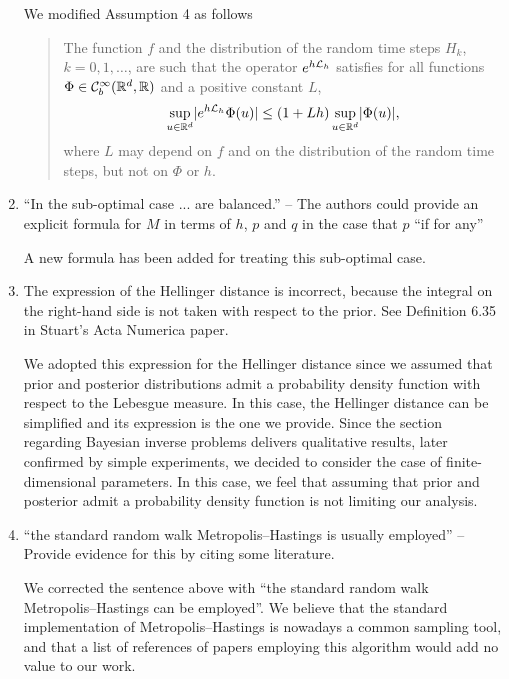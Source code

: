 \documentclass[10pt]{article}
\begin{document}
\begin{enumerate}
\begin{itquote}
	\end{itquote}
	We modified Assumption 4 as follows
	\begin{quote}
		The function $f$ and the distribution of the random time steps $H_k$, $k = 0, 1, \ldots$, are such that the operator $e^{h\mathcal{L}_h}$ satisfies for all functions $\Phi\in \mathcal C^\infty_b(\mathbb{R}^d, \mathbb{R})$ and a positive constant $L$, 
		\begin{equation}
		\sup_{u\in\mathbb{R}^d} \lvert e^{h\mathcal{L}_h}\Phi(u)\rvert \leq (1 + Lh)\sup_{u\in\mathbb{R}^d}\lvert\Phi(u)\rvert,
		\end{equation}
		where $L$ may depend on $f$ and on the distribution of the random time steps, but not on $\Phi$ or $h$.
	\end{quote}
	\item 
	\begin{itquote}
	``In the sub-optimal case ... are balanced.'' -- The authors could provide an explicit formula for $M$ in terms of $h$, $p$ and $q$ in the case that $p$ ``if for any''
	\end{itquote}
	A new formula has been added for treating this sub-optimal case.
	\item 
	\begin{itquote}
		The expression of the Hellinger distance is incorrect, because the integral on the right-hand side is not taken with respect to the prior. See Definition 6.35 in Stuart's Acta Numerica paper.
	\end{itquote}
	We adopted this expression for the Hellinger distance since we assumed that prior and posterior distributions admit a probability density function with respect to the Lebesgue measure. In this case, the Hellinger distance can be simplified and its expression is the one we provide. Since the section regarding Bayesian inverse problems delivers qualitative results, later confirmed by simple experiments, we decided to consider the case of finite-dimensional parameters. In this case, we feel that assuming that prior and posterior admit a probability density function is not limiting our analysis.
	\item 
	\begin{itquote}
		``the standard random walk Metropolis--Hastings is usually employed'' -- Provide evidence for this by citing some literature.
	\end{itquote}
	We corrected the sentence above with ``the standard random walk Metropolis--Hastings can be employed''. We believe that the standard implementation of Metropolis--Hastings is nowadays a common sampling tool, and that a list of references of papers employing this algorithm would add no value to our work.  

\end{enumerate}
\end{document}
